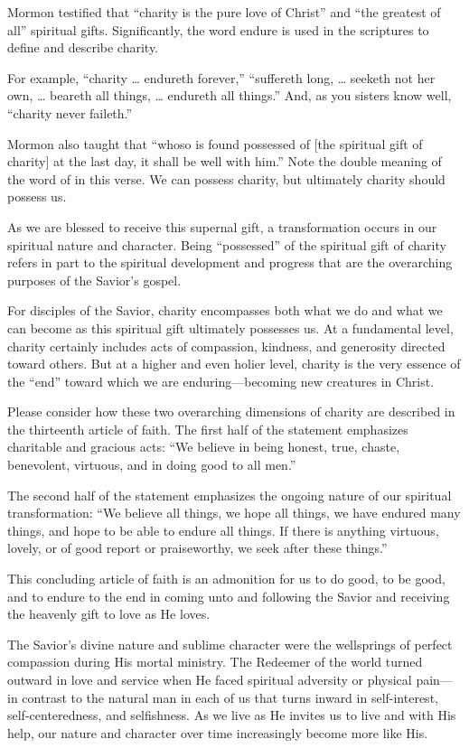\documentclass[letterpaper, 11pt]{report}
\newcommand{\intalkheader}[1]{
    \vspace{0.75em}
    \noindent{\normalsize\bfseries #1}
    \par\nopagebreak %
    \vspace{0.25em}
    \nopagebreak     %
}
\begin{document}
Mormon testified that “charity is the pure love of Christ” and “the greatest of all” spiritual gifts. Significantly, the word endure is used in the scriptures to define and describe charity.

For example, “charity … endureth forever,” “suffereth long, … seeketh not her own, … beareth all things, … endureth all things.” And, as you sisters know well, “charity never faileth.”

Mormon also taught that “whoso is found possessed of [the spiritual gift of charity] at the last day, it shall be well with him.” Note the double meaning of the word of in this verse. We can possess charity, but ultimately charity should possess us.

As we are blessed to receive this supernal gift, a transformation occurs in our spiritual nature and character. Being “possessed” of the spiritual gift of charity refers in part to the spiritual development and progress that are the overarching purposes of the Savior’s gospel.

\intalkheader{Higher and Holier}

For disciples of the Savior, charity encompasses both what we do and what we can become as this spiritual gift ultimately possesses us. At a fundamental level, charity certainly includes acts of compassion, kindness, and generosity directed toward others. But at a higher and even holier level, charity is the very essence of the “end” toward which we are enduring—becoming new creatures in Christ.

Please consider how these two overarching dimensions of charity are described in the thirteenth article of faith. The first half of the statement emphasizes charitable and gracious acts: “We believe in being honest, true, chaste, benevolent, virtuous, and in doing good to all men.”

The second half of the statement emphasizes the ongoing nature of our spiritual transformation: “We believe all things, we hope all things, we have endured many things, and hope to be able to endure all things. If there is anything virtuous, lovely, or of good report or praiseworthy, we seek after these things.”

This concluding article of faith is an admonition for us to do good, to be good, and to endure to the end in coming unto and following the Savior and receiving the heavenly gift to love as He loves.

The Savior’s divine nature and sublime character were the wellsprings of perfect compassion during His mortal ministry. The Redeemer of the world turned outward in love and service when He faced spiritual adversity or physical pain—in contrast to the natural man in each of us that turns inward in self-interest, self-centeredness, and selfishness. As we live as He invites us to live and with His help, our nature and character over time increasingly become more like His.
\end{document}
